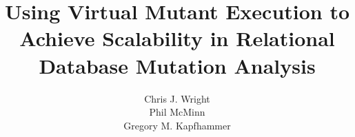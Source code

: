 \documentclass{sig-alternate}
\begin{document}
\title{Using Virtual Mutant Execution to Achieve Scalability in Relational Database Mutation Analysis \vspace*{-.1in}}



\author{
\alignauthor
Chris J. Wright\\
\alignauthor
Phil McMinn\\
\alignauthor
Gregory M. Kapfhammer\\
}

\maketitle

\vspace*{-.75in}








\end{document}
